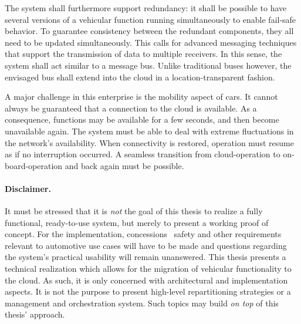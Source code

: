 The system shall furthermore support redundancy: it shall be possible to have several versions of a vehicular function running simultaneously to enable fail-safe behavior. To guarantee consistency between the redundant components, they all need to be updated simultaneously. This calls for advanced messaging techniques that support the transmission of data to multiple receivers. 
In this sense, the system shall act similar to a message bus. Unlike traditional buses however, the envisaged bus shall extend into the cloud in a location-transparent fashion.

A major challenge in this enterprise is the mobility aspect of cars. It cannot always be guaranteed that a connection to the cloud is available. As a consequence, functions may be available for a few seconds, and then become unavailable again. The system must be able to deal with extreme fluctuations in the network's availability. When connectivity is restored, operation must resume as if no interruption occurred. A seamless transition from cloud-operation to on-board-operation and back again must be possible.

\paragraph{Disclaimer.}
It must be stressed that it is \emph{not} the goal of this thesis to realize a fully functional, ready-to-use system, but merely to present a working proof of concept. For the implementation, concessions \wrt\ safety and other requirements relevant to automotive use cases will have to be made and questions regarding the system's practical usability will remain unanswered. This thesis presents a technical realization which allows for the migration of vehicular functionality to the cloud. As such, it is only concerned with architectural and implementation aspects.
It is not the purpose to present high-level repartitioning strategies or a management and orchestration system. Such topics may build \emph{on top} of this thesis' approach.
%
%
%
%
%
%
%
%
%
%
